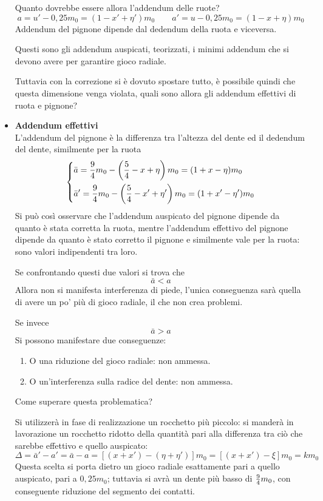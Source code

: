 \documentclass[a4paper, 15pt]{article}
\begin{document}
\begin{adjustwidth}{2in}{}
\begin{itemize}
					Quanto dovrebbe essere allora l'addendum delle ruote? 
					\[a = u'- 0,25m_0 = (1-x'+\eta')m_0 \qquad a' = u- 0,25m_0 = (1-x+\eta)m_0\]
					Addendum del pignone dipende dal dedendum della ruota e viceversa. 
					
					Questi sono gli addendum auspicati, teorizzati, i minimi addendum che si devono avere per garantire gioco radiale. \newline
					
					Tuttavia con la correzione si è dovuto spostare tutto, è possibile quindi che questa dimensione venga violata, quali sono allora gli addendum effettivi di ruota e pignone? 
					
					\item \textbf{Addendum effettivi}\\
					L'addendum del pignone è la differenza tra l'altezza del dente ed il dedendum del dente, similmente per la ruota \[\begin{dcases}
						\bar{a} = \dfrac{9}{4}m_0 - \left(\dfrac{5}{4} -x + \eta\right)m_0 = (1+x-\eta)m_0 \\
						\bar{a}' = \dfrac{9}{4}m_0 - \left(\dfrac{5}{4} -x' + \eta' \right)m_0 = (1+x'-\eta')m_0
					\end{dcases}  \]
					Si può così osservare che l'addendum auspicato del pignone dipende da quanto è stata corretta la ruota, mentre l'addendum effettivo del pignone dipende da quanto è  stato corretto il pignone e similmente vale per la ruota: sono valori indipendenti tra loro. 
					
					Se confrontando questi due valori si trova che 
					\[\bar{a}<a\]
					Allora non si manifesta interferenza di piede, l'unica conseguenza sarà quella di avere un po' più di gioco radiale, il che non crea problemi. 
					
					Se invece 
					\[\bar{a}>a\]
					Si possono manifestare due conseguenze:
					\begin{enumerate}
						\item O una riduzione del gioco radiale: non ammessa.
						\item O un'interferenza sulla radice del dente: non ammessa.
					\end{enumerate}
					Come superare questa problematica? 
					
					Si utilizzerà in fase di realizzazione un rocchetto più piccolo: si manderà in lavorazione un rocchetto ridotto della  quantità pari alla differenza tra ciò che sarebbe effettivo e quello auspicato:
					\[\Delta = \bar{a}' - a' = \bar{a} - a = [(x+x') - (\eta+\eta')]m_0 = [(x+x')-\xi]m_0 = km_0\]
					Questa scelta si porta dietro un gioco radiale esattamente pari a quello auspicato, pari a $0,25m_0$; tuttavia si avrà un dente più basso di ${9\over4}m_0$, con conseguente riduzione del segmento dei contatti. \newline
					

\end{itemize}
\end{adjustwidth}
\end{document}

